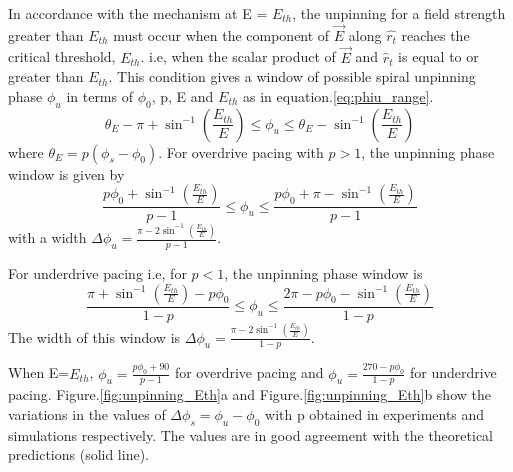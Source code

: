 \documentclass[%
 preprint,
 amsmath,amssymb,
 aps,
]{revtex4-2}
\begin{document}
In accordance with the mechanism at E = $E_{th}$, the unpinning for a field strength greater than $E_{th}$ must occur when the component of $\vec{E}$ along $\hat{r_t}$ reaches the critical threshold, $E_{th}$. i.e, when the scalar product of ${\vec{E}}$ and ${\hat{r}}_{t}$ is equal to or greater than $E_{th}$. This condition gives a window of possible spiral unpinning phase $\phi_{u}$ in terms of $\phi_{0}$, p, E and $E_{th}$ as in equation.\ref{eq:phiu_range}.
\begin{equation}
\theta_{E} - \pi + {\sin^{-1}} (\frac{E_{th}}{E})  \leq \phi_u \leq \theta_{E}-{\sin^{-1}} (\frac{E_{th}}{E}) 
\label{eq:phiu_range}
\end{equation}
where $\theta_{E}=p(\phi_s-\phi_0)$. 
For overdrive pacing with $p>1$, the unpinning phase window is given by
\begin{equation}
\frac{p \phi_0+ {\sin^{-1}}(\frac{E_{th}}{E})}{p-1}   \leq \phi_u \leq \frac{p \phi_0+\pi -{\sin^{-1}}(\frac{E_{th}}{E})}{p-1}
\label{eq:overdrive}
\end{equation}
with a width $\Delta\phi_u = \frac{\pi - 2 \sin^{-1}(\frac{E_{th}}{E})}{p-1}$.

For underdrive pacing i.e, for $p<1$, the unpinning phase window is 
\begin{equation}
\frac{\pi+ {\sin^{-1}}(\frac{E_{th}}{E})-p \phi_0}{1-p}   \leq \phi_u \leq \frac{2\pi-p \phi_0-{\sin^{-1}}(\frac{E_{th}}{E})}{1-p}
\label{eq:underdrive}
\end{equation}
The width of this window is $\Delta\phi_u = \frac{\pi - 2 \sin^{-1}(\frac{E_{th}}{E})}{1-p}$.


When E=$E_{th}$, $\phi_u = \frac{p \phi_0+ 90}{p-1}$ for overdrive pacing and $\phi_u = \frac{270-p \phi_0}{1-p}$ for underdrive pacing. Figure.\ref{fig:unpinning_Eth}a and Figure.\ref{fig:unpinning_Eth}b show the variations in the values of $\Delta\phi_s = \phi_u - \phi_0$ with p obtained in experiments and simulations respectively. The values are in good agreement with the theoretical predictions (solid line). 
\end{document}
